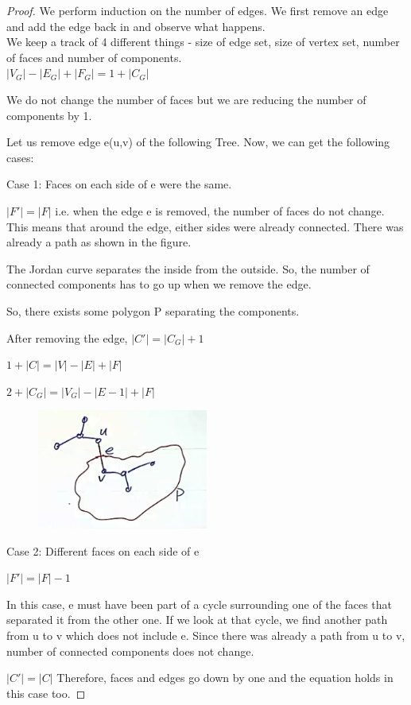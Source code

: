 \documentclass{article}
\begin{document}
\begin{proof}
We perform induction on the number of edges. We first remove an edge and add the edge back in and observe what happens.\\
We keep a track of 4 different things - size of edge set, size of vertex set, number of faces and number of components.\\
$|V_G| - |E_G| + |F_G| = 1 + |C_G|$

We do not change the number of faces but we are reducing the number of components by 1.

Let us remove edge e(u,v) of the following Tree. Now, we can get the following cases:

Case 1: Faces on each side of e were the same.

$|F'| = |F|$ i.e. when the edge e is removed, the number of faces do not change. This means that around the edge, either sides were already connected. There was already a path as shown in the figure.

The Jordan curve separates the inside from the outside. So, the number of connected components has to go up when we remove the edge. 

So, there exists some polygon P separating the components. 

After removing the edge, $|C'| = |C_G| + 1$

$1 + |C| = |V| - |E| + |F|$

$2 + |C_G| = |V_G| - |E-1| + |F|$

\begin{figure}[ht]
    \centering
    \includegraphics[width=0.5\textwidth]{images/Induction_trees.PNG}
    \caption{}
    \label{fig:Induction on trees}
\end{figure}

Case 2: Different faces on each side of e

$|F'| = |F| - 1$

In this case, e must have been part of a cycle surrounding one of the faces that separated it from the other one. If we look at that cycle, we find
another path from u to v which does not include e. Since there was already a path from u to v, number of connected components does not change.

$|C'| = |C|$
Therefore, faces and edges go down by one and the equation holds in this case too.
\end{proof}


\end{document}
